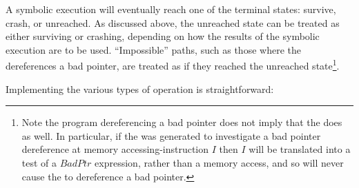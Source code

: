 A symbolic execution will eventually reach one of the {\StateMachine}
terminal states: survive, crash, or unreached.  As discussed above,
the unreached state can be treated as either surviving or crashing,
depending on how the results of the symbolic execution are to be used.
``Impossible'' paths, such as those where the {\StateMachine}
dereferences a bad pointer, are treated as if they reached the
unreached state\footnote{Note the program dereferencing a bad pointer
  does not imply that the {\StateMachine} does as well.  In
  particular, if the {\StateMachine} was generated to investigate a
  bad pointer dereference at memory accessing-instruction $I$ then $I$
  will be translated into a test of a $BadPtr$ expression, rather than
  a memory access, and so will never cause the {\StateMachine} to
  dereference a bad pointer.}.

Implementing the various types of \StateMachine operation is
straightforward:


